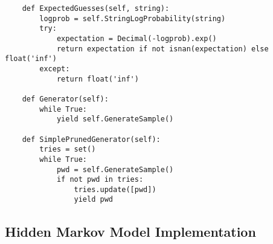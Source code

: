 \documentclass{amsart}
\theoremstyle{definition}
\theoremstyle{remark}
\numberwithin{equation}{section}
\begin{document}
\begin{lstlisting}
    def ExpectedGuesses(self, string):
        logprob = self.StringLogProbability(string)
        try:
            expectation = Decimal(-logprob).exp()
            return expectation if not isnan(expectation) else float('inf')
        except:
            return float('inf')

    def Generator(self):
        while True:
            yield self.GenerateSample()

    def SimplePrunedGenerator(self):
        tries = set()
        while True:
            pwd = self.GenerateSample()
            if not pwd in tries:
                tries.update([pwd])
                yield pwd

\end{lstlisting}
\newpage
\subsection{Hidden Markov Model Implementation}
\end{document}
